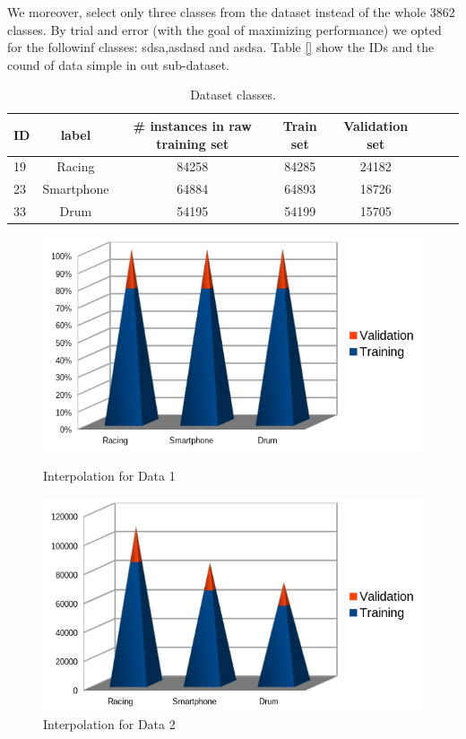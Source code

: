 \documentclass{article}
\begin{document}
We moreover, select only three classes from the dataset instead of the whole 3862 classes. By trial and error (with the goal of maximizing performance) we opted for the followinf classes: sdsa,asdasd and asdsa. Table \ref{} show the IDs and the cound of data simple in out sub-dataset.

\begin{table}
\center

\begin{tabular}{l*{6}{c}r}
ID           & label & \# instances in raw training set & Train set & Validation set \\
\hline
19 			 & Racing & 84258 & 84285 & 24182 \\
23          & Smartphone & 64884 & 64893  & 18726 \\
33          & Drum & 54195 & 54199 & 15705 \\

\end{tabular}
\caption{Dataset classes.}
\end{table}

\begin{figure}[!htb]
   \begin{minipage}{0.5\textwidth}
     \centering
     \includegraphics[width=\linewidth]{img/d_s}
     \caption{Interpolation for Data 1}\label{Fig:Data1}
   \end{minipage}\hfill
   \begin{minipage}{0.5\textwidth}
     \centering
     \includegraphics[width=\linewidth]{img/d}
     \caption{Interpolation for Data 2}\label{Fig:Data2}
   \end{minipage}
\end{figure}
\end{document}
